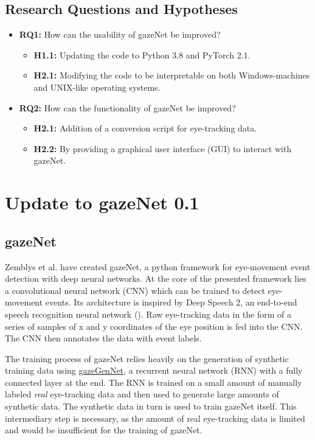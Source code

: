 \documentclass[conference]{IEEEtran}
\begin{document}
\subsection{Research Questions and Hypotheses} 
\begin{itemize}
    \item \textbf{RQ1:} How can the usability of gazeNet be improved?
        \begin{itemize}
            \item \textbf{H1.1:} Updating the code to Python 3.8 and PyTorch 2.1.
            \item \textbf{H2.1:} Modifying the code to be interpretable on both Windows-machines and UNIX-like operating systems.
        \end{itemize}
    \item \textbf{RQ2:} How can the functionality of gazeNet be improved?
        \begin{itemize}
            \item \textbf{H2.1:} Addition of a conversion script for eye-tracking data.
            \item \textbf{H2.2:} By providing a graphical user interface (GUI) to interact with gazeNet.
        \end{itemize}
\end{itemize}


\section{Update to gazeNet 0.1}
\subsection{gazeNet}
Zemblys et al. \cite{zemblys2018gazeNet} have created gazeNet, a python framework for eye-movement event detection with deep neural networks. At the core of the presented framework lies a convolutional neural network (CNN) which can be trained to detect eye-movement events. Its architecture is inspired by Deep Speech 2, an end-to-end speech recognition neural network (\cite{deep_speech_2,zemblys2018gazeNet}). Raw eye-tracking data in the form of a series of samples of x and y coordinates of the eye position is fed into the CNN. The CNN then annotates the data with event labels.

The training process of gazeNet relies heavily on the generation of synthetic training data using \href{https://github.com/r-zemblys/gazeGenNet}{gazeGenNet}, a recurrent neural network (RNN) with a fully connected layer at the end. The RNN is trained on a small amount of manually labeled \emph{real} eye-tracking data and then used to generate large amounts of synthetic data. The synthetic data in turn is used to train gazeNet itself. This intermediary step is necessary, as the amount of real eye-tracking data is limited and would be insufficient for the training of gazeNet. \cite{zemblys2018gazeNet}
\end{document}
